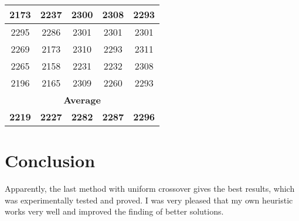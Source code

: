 \documentclass{article}
\begin{document}
\begin{table}[htb]
\begin{tabular}{c|c|c|c|c}
	\multicolumn{1}{c}{2173} &	\multicolumn{1}{c}{2237} &	\multicolumn{1}{c}{2300} &	\multicolumn{1}{c}{2308} &	\multicolumn{1}{c}{2293}  \\ \hline 
	\multicolumn{1}{c}{2295} &	\multicolumn{1}{c}{2286} &	\multicolumn{1}{c}{2301} &	\multicolumn{1}{c}{2301} &	\multicolumn{1}{c}{2301}  \\ \hline 
	\multicolumn{1}{c}{2269} &	\multicolumn{1}{c}{2173} &	\multicolumn{1}{c}{2310} &	\multicolumn{1}{c}{2293} &	\multicolumn{1}{c}{2311}  \\ \hline 
	\multicolumn{1}{c}{2265} &	\multicolumn{1}{c}{2158} &	\multicolumn{1}{c}{2231} &	\multicolumn{1}{c}{2232} &	\multicolumn{1}{c}{2308}  \\ \hline 
	\multicolumn{1}{c}{2196} &	\multicolumn{1}{c}{2165} &	\multicolumn{1}{c}{2309} &	\multicolumn{1}{c}{2260} &	\multicolumn{1}{c}{2293}  \\ \hline \hline 
     \multicolumn{5}{c}{\textbf{Average}} \\ \hline
	\multicolumn{1}{c}{\textbf{2219}} &	\multicolumn{1}{c}{\textbf{2227}} &	\multicolumn{1}{c}{\textbf{2282}} &	\multicolumn{1}{c}{\textbf{2287}} &	\multicolumn{1}{c}{\textbf{2296}}  \\
\end{tabular}
\end{table}


\section{Conclusion}
	Apparently, the last method with uniform crossover gives the best results, which was experimentally tested and proved. I was very pleased that my own heuristic works very well and improved the finding of better solutions.
\end{document}
